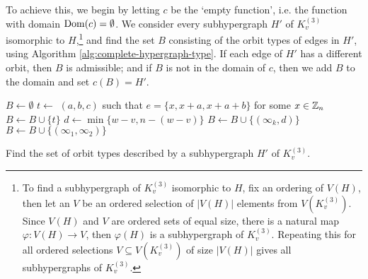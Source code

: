 To achieve this, we begin by letting $c$ be the `empty function', i.e. the function with domain $\operatorname{Dom}(c) = \emptyset$. %
We consider every subhypergraph $H'$ of $K_{v}^{(3)}$ isomorphic to
$H$,\footnote{To find a subhypergraph of $K_{v}^{(3)}$ isomorphic to $H$, fix an ordering of $V(H)$, then let an $V$ be an ordered selection of $|V(H)|$ elements from $V(K_{v}^{(3)})$. Since $V(H)$ and $V$ are ordered sets of equal size, there is a natural map $\varphi: V(H) \to V$, then $\varphi(H)$ is a subhypergraph of $K_{v}^{(3)}$. Repeating this for all ordered selections $V \subseteq V(K_{v}^{(3)})$ of size $|V(H)|$ gives all subhypergraphs of $K_{v}^{(3)}$.}
and find the set $B$ consisting of the orbit types of edges in $H'$, using Algorithm \ref{alg:complete-hypergraph-type}.
If each edge of $H'$ has a different orbit, then $B$ is admissible; and if $B$ is not in the domain of $c$, then we add $B$ to the domain and set $c(B) = H'$.

\begin{algorithm}
$B \gets \emptyset$\;
 {
     {
        $t \gets$ $(a, b, c)$ such that $e=\{x,x+a,x+a+b\}$ for some $x \in \mathbb{Z}_n$\;
        $B \gets B \cup \{t\}$\;
    }  {
        $d \gets \min \{w-v, n-(w-v)\}$\;
        $B \gets B \cup \{(\infty_k, d)\}$ \;
    }  {
        $B \gets B \cup \{(\infty_1, \infty_2)\}$\;
    }
}
\;
\caption{Find the set of orbit types described by a subhypergraph $H'$ of $K_{v}^{(3)}$.} \label{alg:complete-hypergraph-type}
\end{algorithm}


